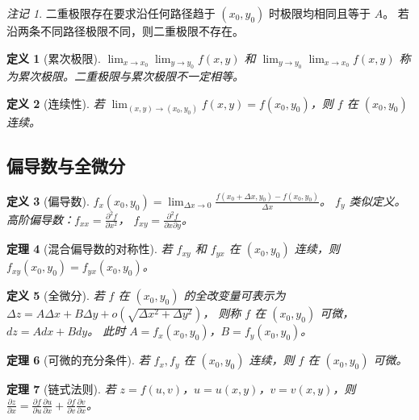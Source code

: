 \documentclass[12pt,a4paper]{ctexart}
\newtheorem{theorem}{定理}[section]
\newtheorem{definition}[theorem]{定义}
\theoremstyle{remark}
\newtheorem{remark}{注记}[section]
\begin{document}
\begin{remark}
二重极限存在要求沿任何路径趋于 $(x_0,y_0)$ 时极限均相同且等于 $A$。
若沿两条不同路径极限不同，则二重极限不存在。
\end{remark}

\begin{definition}[累次极限]
$\lim_{x\to x_0}\lim_{y\to y_0} f(x,y)$ 和 $\lim_{y\to y_0}\lim_{x\to x_0} f(x,y)$
称为累次极限。二重极限与累次极限不一定相等。
\end{definition}

\begin{definition}[连续性]
若 $\lim_{(x,y)\to(x_0,y_0)} f(x,y) = f(x_0,y_0)$，则 $f$ 在 $(x_0,y_0)$ 连续。
\end{definition}

\subsection{偏导数与全微分}

\begin{definition}[偏导数]
$f_x(x_0,y_0) = \lim_{\Delta x\to 0} \frac{f(x_0+\Delta x, y_0)-f(x_0,y_0)}{\Delta x}$。
$f_y$ 类似定义。
高阶偏导数：$f_{xx} = \frac{\partial^2 f}{\partial x^2}$，
$f_{xy} = \frac{\partial^2 f}{\partial x \partial y}$。
\end{definition}

\begin{theorem}[混合偏导数的对称性]
若 $f_{xy}$ 和 $f_{yx}$ 在 $(x_0,y_0)$ 连续，则 $f_{xy}(x_0,y_0) = f_{yx}(x_0,y_0)$。
\end{theorem}

\begin{definition}[全微分]
若 $f$ 在 $(x_0,y_0)$ 的全改变量可表示为
$\Delta z = A\Delta x + B\Delta y + o(\sqrt{\Delta x^2 + \Delta y^2})$，
则称 $f$ 在 $(x_0,y_0)$ 可微，$dz = A dx + B dy$。
此时 $A = f_x(x_0,y_0)$，$B = f_y(x_0,y_0)$。
\end{definition}

\begin{theorem}[可微的充分条件]
若 $f_x, f_y$ 在 $(x_0,y_0)$ 连续，则 $f$ 在 $(x_0,y_0)$ 可微。
\end{theorem}

\begin{theorem}[链式法则]
若 $z = f(u,v)$，$u = u(x,y)$，$v = v(x,y)$，则
$\frac{\partial z}{\partial x} = \frac{\partial f}{\partial u}\frac{\partial u}{\partial x}
+ \frac{\partial f}{\partial v}\frac{\partial v}{\partial x}$。
\end{theorem}
\end{document}
